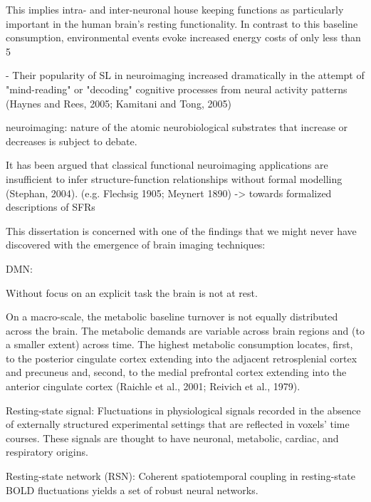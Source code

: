 \documentclass[authoryear,review,3p]{elsarticle}
\begin{document}
This implies intra- and inter-neuronal house keeping functions as particularly important in the human brain's resting functionality. In contrast to this baseline consumption, environmental events evoke increased energy costs of only less than 5%









- Their popularity of SL in neuroimaging increased dramatically in the attempt of "mind-reading" or "decoding" cognitive processes from neural activity patterns (Haynes and Rees, 2005; Kamitani and Tong, 2005)


neuroimaging: nature of the atomic neurobiological substrates
that increase or decreases is subject to debate.



It has been argued that classical functional neuroimaging applications
are insufficient to infer structure-function relationships
without formal modelling (Stephan, 2004).
(e.g. Flechsig 1905; Meynert 1890)
-> towards formalized descriptions of SFRs


This dissertation is concerned with one of the findings that
we might never have discovered with the emergence of
brain imaging techniques:

DMN:

Without focus on an explicit task the brain is not at rest.

On a macro-scale, the metabolic baseline turnover is not equally distributed across the brain. The metabolic demands are variable across brain regions and (to a smaller extent) across time. The highest metabolic consumption locates, first, to the posterior cingulate cortex extending into the adjacent retrosplenial cortex and precuneus and, second, to the medial prefrontal cortex extending into the anterior cingulate cortex (Raichle et al., 2001; Reivich et al., 1979).

Resting-state signal: Fluctuations in physiological signals recorded in the absence of externally structured experimental settings that are reflected in voxels' time courses. These signals are thought to have neuronal, metabolic, cardiac, and respiratory origins.

Resting-state network (RSN):  Coherent spatiotemporal coupling in resting-state BOLD fluctuations yields a set of robust neural networks.
\end{document}
